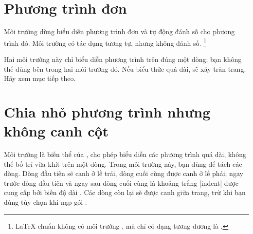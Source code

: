 \section{Phương trình đơn}

Môi trường  dùng biểu diễn phương trình đơn
và tự động đánh số cho phương trình đó. Môi trường 
có tác dụng tương tự, nhưng không đánh số.%
\footnote{\LaTeX{} chuẩn không có môi trường , mà
chỉ có dạng tương đương là .}

\medskip

Hai môi trường này chỉ biểu diễn phương trình trên đúng một dòng;
bạn không thể dùng \cn{\\} bên trong hai môi trường đó.
Nếu biểu thức quá dài, sẽ xảy tràn trang. Hãy xem mục tiếp theo.

\section{Chia nhỏ phương trình nhưng không canh cột}

Môi trường  là biến thể của , cho phép
biểu diễn các phương trình quá dài, không thể bố trí vừa khít trên một dòng.
Trong môi trường này, bạn dùng \cn{\\} để tách các dòng.
Dòng đầu tiên sẽ canh ở lề trái, dòng cuối cùng được canh ở lề phải;
ngay trước dòng đầu tiên và ngay sau dòng cuối cùng là khoảng trắng |indent|
được cung cấp bởi biến độ dài .
Các dòng còn lại sẽ được canh giữa trang, trừ khi bạn dùng tùy chọn 
khi nạp gói .

